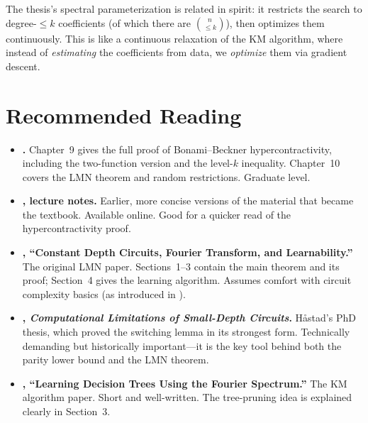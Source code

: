 \begin{remark}\label{rem:km-thesis}
The thesis's spectral parameterization is related in spirit: it
restricts the search to degree-$\leq k$ coefficients (of which there are
$\binom{n}{\leq k}$), then optimizes them continuously. This is like a
continuous relaxation of the KM algorithm, where instead of
\emph{estimating} the coefficients from data, we \emph{optimize} them via
gradient descent.
\end{remark}


\section*{Recommended Reading}

\begin{itemize}
  \item \textbf{\citet[Chapters~9--10]{odonnell2014analysis}.}
    Chapter~9 gives the full proof of Bonami--Beckner hypercontractivity,
    including the two-function version and the level-$k$ inequality.
    Chapter~10 covers the LMN theorem and random restrictions.
    Graduate level.

  \item \textbf{\citet{odonnell2007lecture}, lecture notes.}
    Earlier, more concise versions of the material that became the
    textbook. Available online. Good for a quicker read of the
    hypercontractivity proof.

  \item \textbf{\citet{linial1993constant}, ``Constant Depth Circuits,
    Fourier Transform, and Learnability.''}
    The original LMN paper. Sections~1--3 contain the main theorem and
    its proof; Section~4 gives the learning algorithm. Assumes comfort
    with circuit complexity basics (as introduced in
    ).

  \item \textbf{\citet{hastad1987computational}, \emph{Computational
    Limitations of Small-Depth Circuits}.}
    H\r{a}stad's PhD thesis, which proved the switching lemma in its
    strongest form. Technically demanding but historically important---it
    is the key tool behind both the parity lower bound and the LMN
    theorem.

  \item \textbf{\citet{kushilevitz1991learning}, ``Learning Decision
    Trees Using the Fourier Spectrum.''}
    The KM algorithm paper. Short and well-written. The tree-pruning
    idea is explained clearly in Section~3.
\end{itemize}
